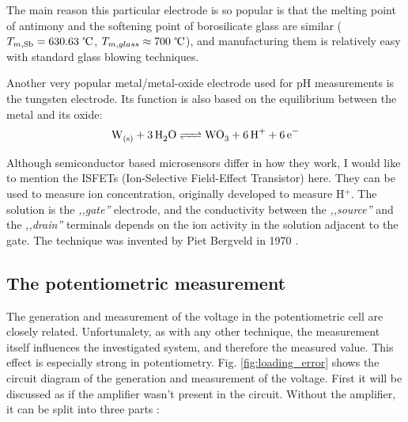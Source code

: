 The main reason this particular electrode is so popular is that the melting point of antimony and the softening point of borosilicate glass are similar ($T_{m, \textrm{Sb}} = 630.63~\celsius$, $T_{m, glass}\approx 700~\celsius$), and manufacturing them is relatively easy with standard glass blowing techniques.

Another very popular metal/metal-oxide electrode used for pH measurements is the tungsten electrode. Its function is also based on the equilibrium between the metal and its oxide:
\begin{equation}
        \ce{W_{(s)} + 3H_2O <=> WO_3 + 6H^+ + 6e^-}
\end{equation}

Although semiconductor based microsensors differ in how they work, I would like to mention the ISFETs (Ion-Selective Field-Effect Transistor) here.
They can be used to measure ion concentration, originally developed to measure H$^+$.
The solution is the \emph{,,gate''} electrode, and the conductivity between the \emph{,,source''} and the \emph{,,drain''} terminals depends on the ion activity in the solution adjacent to the gate.
The technique was invented by Piet Bergveld in 1970 \cite{toumazou2011piet}.


		\subsection{The potentiometric measurement}
The generation and measurement of the voltage in the potentiometric cell are closely related.
Unfortunalety, as with any other technique, the measurement itself influences the investigated system, and therefore the measured value.
This effect is especially strong in potentiometry.
Fig. \ref{fig:loading_error} shows the circuit diagram of the generation and measurement of the voltage.
First it will be discussed as if the amplifier wasn't present in the circuit.
Without the amplifier, it can be split into three parts \cite{halliwell1987using}:

